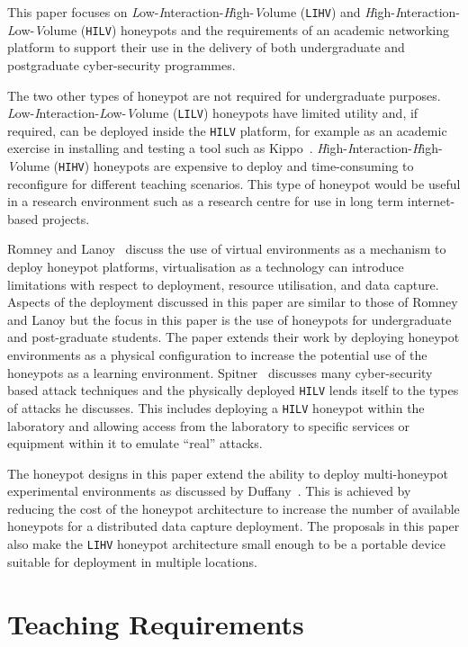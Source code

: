 This paper focuses on \emph{L}ow-\emph{I}nteraction-\emph{H}igh-\emph{V}olume
(\texttt{LIHV}) and \emph{H}igh-\emph{I}nteraction-\emph{L}ow-\emph{V}olume
(\texttt{HILV}) honeypots and the requirements of an academic networking
platform to support their use in the delivery of both undergraduate and
postgraduate cyber-security programmes.

The two other types of honeypot are not required for undergraduate purposes.
\emph{L}ow-\emph{I}nteraction-\emph{L}ow-\emph{V}olume (\texttt{LILV})
honeypots have limited utility and, if required,  can be deployed inside the
\texttt{HILV} platform, for example as an academic exercise in installing and
testing a tool such as Kippo~\cite{D:16,SH:15}.
\emph{H}igh-\emph{I}nteraction-\emph{H}igh-\emph{V}olume (\texttt{HIHV})
honeypots are expensive to deploy and time-consuming to reconfigure for
different teaching scenarios. This type of honeypot would be useful in a
research environment such as a research centre for use in long term
internet-based projects. 

Romney and Lanoy~\cite{LR:06} discuss the use of virtual environments as a
mechanism to deploy honeypot platforms, virtualisation as a technology can
introduce limitations with respect to deployment, resource utilisation, and
data capture. Aspects of the deployment discussed in this paper are similar to
those of Romney and Lanoy but the focus in this paper is the use of honeypots
for undergraduate and post-graduate students. The paper extends their work by
deploying honeypot environments as a physical configuration to increase the
potential use of the honeypots as a learning environment. Spitner~\cite{LS:03}
discusses many cyber-security based attack techniques and the physically
deployed \texttt{HILV} lends itself to the types of attacks he discusses. This
includes deploying a \texttt{HILV} honeypot within the laboratory and allowing
access from the laboratory to specific services or equipment within it to
emulate ``real'' attacks.

The honeypot designs in this paper extend the ability to deploy multi-honeypot
experimental environments as discussed by Duffany~\cite{JD:08}. This is
achieved by reducing the cost of the honeypot architecture to increase the
number of available honeypots for a distributed data capture deployment. The
proposals in this paper also make the \texttt{LIHV} honeypot architecture small
enough to be a portable device suitable for deployment in multiple locations.

\section{Teaching Requirements}\label{sec:TeachingRequire}

